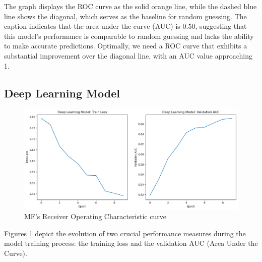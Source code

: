 \documentclass[9pt,twocolumn,twoside,lineno]{gsajnl}
\begin{document}
The graph displays the ROC curve as the solid orange line, while the dashed blue line shows the diagonal, which serves as the baseline for random guessing. The caption indicates that the area under the curve (AUC) is 0.50, suggesting that this model's performance is comparable to random guessing and lacks the ability to make accurate predictions. Optimally, we need a ROC curve that exhibits a substantial improvement over the diagonal line, with an AUC value approaching 1.

\subsection{Deep Learning Model}
\begin{figure}
    \centering
    \includegraphics[width=\linewidth]{material/6.png}
    \caption{MF's Receiver Operating Characteristic curve}
    \label{fig:7}
\end{figure}
Figures \ref{fig:7} depict the evolution of two crucial performance measures during the model training process: the training loss and the validation AUC (Area Under the Curve).
\end{document}
